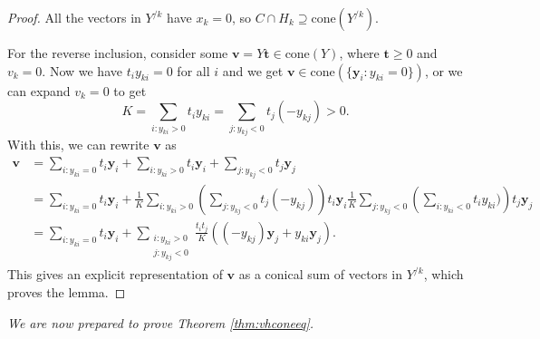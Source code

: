 		\begin{proof}
			All the vectors in $Y^{/k}$ have $x_k = 0$, so $C \cap H_k \supseteq \text{cone}
			(Y^{/k})$. 
			
			For the reverse inclusion, consider some $\boldsymbol{v} = Y\boldsymbol{t} \in 
			\text{cone}(Y)$, where $\boldsymbol{t} \geq 0$ and $v_k = 0$. 
			Now we have $t_i y_{ki} = 0$ for all $i$ and we get $\boldsymbol{v} \in \text{cone} 
			( \{\boldsymbol{y}_i : y_{ki} = 0 \} )$, or we can expand $v_k = 0$ to get
			\[
			K = \sum_{i:y_{ki} > 0} t_i y_{ki} = \sum_{j:y_{kj} < 0} t_j(-y_{kj}) > 0.
			\]
			With this, we can rewrite $\boldsymbol{v}$ as 
			\begin{align*}
				\boldsymbol{v} &= 
				\sum_{i:y_{ki} = 0} t_i \boldsymbol{y}_i + 
				\sum_{i:y_{ki} > 0} t_i \boldsymbol{y}_i + 
				\sum_{j:y_{kj} < 0} t_j \boldsymbol{y}_j \\
				&= 
				\sum_{i:y_{ki} = 0} t_i \boldsymbol{y}_i + 
				\frac{1}{K} \sum_{i:y_{ki}>0} \left( \sum_{j:y_{kj}<0} t_j(-y_{kj}) \right) 
				t_i \boldsymbol{y}_i
				\frac{1}{K} \sum_{j:y_{kj}<0} \left( \sum_{i:y_{ki}<0} t_i y_{ki})
				\right) t_j \boldsymbol{y}_j \\
				&= 
				\sum_{i:y_{ki} = 0} t_i \boldsymbol{y}_i + 
				\sum_{\substack{i:y_{ki}>0 \\ j:y_{kj}<0}} \frac{t_i t_j}{K} \left(
				(-y_{kj})\boldsymbol{y}_j + y_{ki}\boldsymbol{y}_j \right).
			\end{align*}
			This gives an explicit representation of $\boldsymbol{v}$ as a conical sum of vectors 
			in $Y^{/k}$, which proves the lemma.
		\end{proof}
		
		\emph{
		We are now prepared to prove Theorem \ref{thm:vhconeeq}. 
		}		
		

